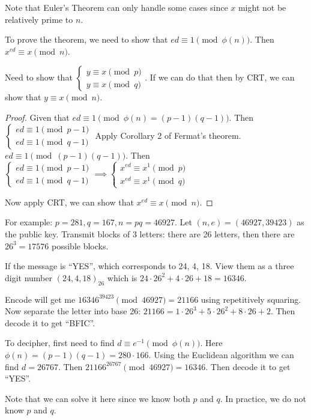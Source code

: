 \documentclass[letterpaper,12pt,oneside]{article}
\begin{document}
Note that Euler's Theorem can only handle some cases since $x$ might not be relatively prime to $n$.

To prove the theorem, we need to show that $ed\equiv 1 \pmod {\phi(n)}$. Then $x^{ed}\equiv x \pmod n$.

Need to show that $\begin{cases}
    y\equiv x \pmod p \\
    y\equiv x \pmod q
\end{cases}$. If we can do that then by CRT, we can show that $y\equiv x \pmod n$.\begin{proof}
    Given that $ed\equiv 1 \pmod {\phi(n) = (p-1)(q-1)}$. Then $\begin{cases}
        ed\equiv 1 \pmod {p-1} \\
        ed\equiv 1 \pmod {q-1}
    \end{cases} $
    Apply Corollary 2 of Fermat's theorem. $ed\equiv 1 \pmod {(p-1)(q-1)}$. Then $\begin{cases}
        ed\equiv 1 \pmod {p-1} \\
        ed\equiv 1 \pmod {q-1}
    \end{cases}  \implies \begin{cases}
        x^{ed}\equiv x^1 \pmod {p} \\
        x^{ed}\equiv x^1 \pmod {q}
        \end{cases}$

    Now apply CRT, we can show that  $x^{ed}\equiv x \pmod n$.
\end{proof}
For example: $p=281, q=167, n = pq = 46927$. Let $(n,e) = (46927, 39423)$ as the public key. Transmit blocks of 3 letters: there are 26 letters, then there are $26^3 = 17576$ possible blocks. 

If the message is ``YES'', which corresponds to 24, 4, 18. View them as a three digit number $(24, 4, 18)_{26}$ which is $24\cdot 26^2 + 4\cdot 26 + 18 = 16346$. 

Encode will get me $16346^{39423} \pmod {46927} = 21166$ using repetitively squaring. Now separate the letter into base 26: $21166=1\cdot 26^3 + 5\cdot 26^2 + 8\cdot 26 + 2$. Then decode it to get ``BFIC''.

To decipher, first need to find $d\equiv e^{-1} \pmod {\phi(n)}$. Here $\phi(n) = (p-1)(q-1) = 280\cdot 166$. Using the Euclidean algorithm we can find $d = 26767$. Then $21166^{26767} \pmod {46927} = 16346$. Then decode it to get ``YES''.

Note that we can solve it here since we know both $p$ and $q$. In practice, we do not know $p$ and $q$.
\end{document}
